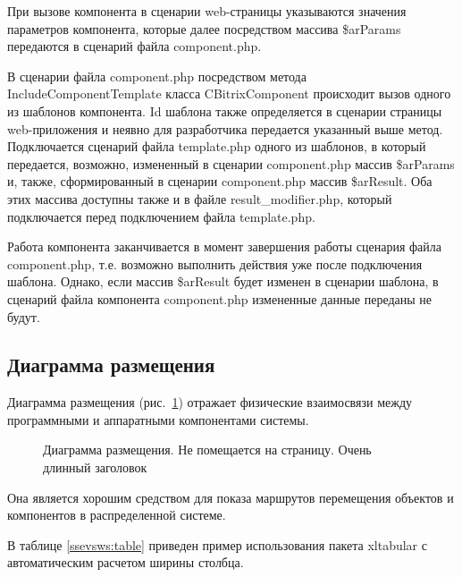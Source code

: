 При вызове компонента в сценарии web-страницы указываются значения параметров компонента, которые далее посредством массива \$arParams передаются в сценарий файла component.php.

В сценарии файла component.php посредством метода \linebreak IncludeComponentTemplate класса CBitrixComponent происходит вызов одного из шаблонов компонента. Id шаблона также определяется в сценарии страницы web-приложения и неявно для разработчика передается указанный выше метод. Подключается сценарий файла template.php одного из шаблонов, в который передается, возможно, измененный в сценарии component.php массив \$arParams и, также, сформированный в сценарии component.php массив \$arResult. Оба этих массива доступны также и в файле result\_modifier.php, который подключается перед подключением файла template.php. 

Работа компонента заканчивается в момент завершения работы сценария файла component.php, т.е. возможно выполнить действия уже после подключения шаблона. Однако, если массив \$arResult будет изменен в сценарии шаблона, в сценарий файла компонента component.php измененные данные переданы не будут.

\subsection{Диаграмма размещения}

Диаграмма размещения (рис.~\ref{place:image}) отражает физические взаимосвязи между программными и аппаратными компонентами системы.

\vspace{-8mm} %
\begin{figure}[ht]
\caption{Диаграмма размещения. Не помещается на страницу. Очень длинный заголовок}
\label{place:image}
\end{figure}

Она является хорошим средством для показа маршрутов перемещения объектов и компонентов в распределенной системе.

В таблице \ref{ssevsws:table} приведен пример использования пакета xltabular с автоматическим расчетом ширины столбца.


